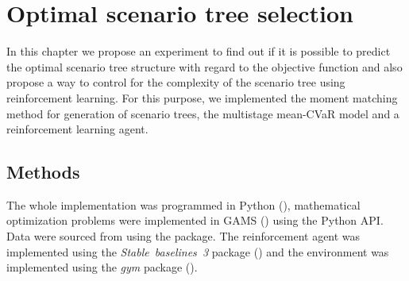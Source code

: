 \chapter{Optimal scenario tree selection}
\label{chapter4}
In this chapter we propose an experiment to find out if it is possible to predict the optimal scenario tree structure with regard to the objective function and also propose a way to control for the complexity of the scenario tree using reinforcement learning. For this purpose, we implemented the moment matching method for generation of scenario trees, the multistage mean-CVaR model and a reinforcement learning agent.
\section{Methods}
The whole implementation was programmed in Python (\cite[Version 3.11]{python}), mathematical optimization problems were implemented in GAMS (\cite[version 40.3.0]{GAMS}) using the Python API. Data were sourced from \cite{yahoo} using the \cite[version 0.1.74]{yfinance} package. The reinforcement agent was implemented using the \textit{Stable~baselines~3} package (\cite[version 1.6.2]{stable_baselines3}) and the environment was implemented using the \textit{gym} package (\cite[version 0.21.0]{openai_gym}).

